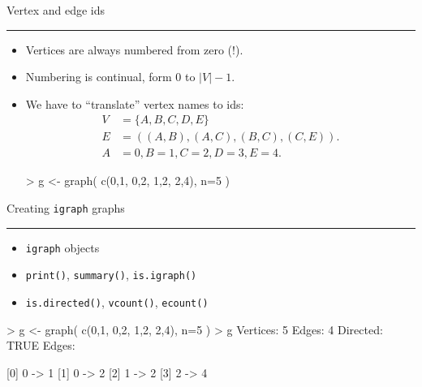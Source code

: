 \documentclass[landscape,fleqno]{foils}
\newcommand{\stitle}[1]{{\color{blue}\Large #1\par\vspace*{10pt}\hrule}}
\newcommand{\igraph}{\texttt{{igraph}}\xspace}
\newenvironment{narrow}[2]{%
  \begin{list}{}{%
      \setlength{\topsep}{0pt}%
      \setlength{\leftmargin}{#1}%
      \setlength{\rightmargin}{#2}%
      \setlength{\listparindent}{\parindent}%
      \setlength{\itemindent}{\parindent}%
      \setlength{\parsep}{\parskip}}%
    \item[]}{\end{list}}
\begin{document}
\newpage
\stitle{Vertex and edge ids}
\begin{narrow}{0cm}{12cm}
\begin{itemize}
\item Vertices are always numbered from zero (!).
\item Numbering is continual, form 0 to $|V|-1$. \pause
\item We have to ``translate'' vertex names to ids: 
\begin{align} 
  V & =\{A,B,C,D,E\} \nonumber\\
  E & =( (A,B),(A,C),(B,C),(C,E) ). \nonumber\\
  A & =0, B=1, C=2, D=3, E=4. \nonumber
\end{align} \pause
\begin{Myverb}
  > g <- graph( c(0,1, 0,2, 1,2, 2,4), n=5 )
\end{Myverb}
\end{itemize}
\end{narrow}

\newpage
\stitle{Creating \igraph graphs}
\begin{narrow}{0cm}{12cm}
\begin{itemize}
\item \igraph objects \pause
\item \verb+print()+, \verb+summary()+, \verb+is.igraph()+ \pause
\item \verb+is.directed()+, \verb+vcount()+, \verb+ecount()+
\end{itemize}
\begin{Myverb}
  > g <- graph( c(0,1, 0,2, 1,2, 2,4), n=5 )
  > g
  Vertices: 5 
  Edges: 4 
  Directed: TRUE 
  Edges:
          
  [0] 0 -> 1
  [1] 0 -> 2
  [2] 1 -> 2
  [3] 2 -> 4
\end{Myverb}
\end{narrow}
\end{document}
